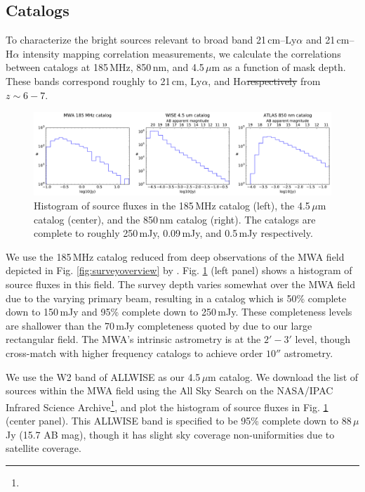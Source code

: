 \documentclass[numberedappendix]{emulateapj}
\providecommand{\DIFadd}[1]{{\protect\color{blue}\uwave{#1}}} %
\providecommand{\DIFdel}[1]{{\protect\color{red}\sout{#1}}}                      %
\providecommand{\DIFaddbegin}{} %
\providecommand{\DIFaddend}{} %
\providecommand{\DIFdelbegin}{} %
\providecommand{\DIFdelend}{} %
\providecommand{\DIFaddbeginFL}{} %
\providecommand{\DIFaddendFL}{} %
\providecommand{\DIFdelbeginFL}{} %
\providecommand{\DIFdelendFL}{} %
\begin{document}
\subsection{Catalogs}
\label{sec:catalogs}

To characterize the bright sources relevant to broad band  21\,cm--Ly$\alpha$ and  21\,cm--H$\alpha$ intensity mapping correlation measurements, we calculate the correlations between catalogs at 185\,MHz, 850\,nm, and 4.5\,$\mu$m as a function of mask depth. These bands correspond roughly to 21\,cm, Ly$\alpha$, and H$\alpha$\DIFdelbegin \DIFdel{respectively }\DIFdelend \DIFaddbegin \DIFadd{, respectively, }\DIFaddend from $z\sim6-7$. 

\begin{figure}[t]
\centering
\DIFdelbeginFL %
\DIFdelendFL \DIFaddbeginFL \includegraphics[width=6.5in]{chap5_xcor/catalog_histograms.pdf}
\DIFaddendFL \caption[Histogram of source fluxes in the 185\,MHz, 850\,nm, and 4.5\,$\mu$m catalogs.]{Histogram of source fluxes in the 185\,MHz catalog (left), the 4.5\,$\mu$m catalog (center), and the 850\,nm catalog (right). The catalogs are complete to roughly 250\,mJy, 0.09\,mJy, and 0.5\,mJy respectively.}
\label{fig:cataloghistograms}
\end{figure}

We use the 185\,MHz catalog reduced from deep observations of the MWA field depicted in Fig. \ref{fig:surveyoverview} by \citet{PattiCatalog1}. Fig. \ref{fig:cataloghistograms} (left panel) shows a histogram of source fluxes in this field. The survey depth varies somewhat over the MWA field due to the varying primary beam, resulting in a catalog which is 50\% complete down to 150\,mJy and 95\% complete down to 250\,mJy. These completeness levels are shallower than the 70\,mJy completeness quoted by \citet{PattiCatalog1} due to our large rectangular field. The MWA's intrinsic astrometry is at the $2'-3'$ level, though \citep{PattiCatalog1} cross-match with higher frequency catalogs to achieve order $10''$ astrometry. 

We use the W2 band of ALLWISE \citep{Wright2010,allwise} as our 4.5\,$\mu$m catalog. We download the list of sources within the MWA field using the All Sky Search on the NASA/IPAC Infrared Science Archive\footnote{}, and plot the histogram of source fluxes in Fig. \ref{fig:cataloghistograms} (center panel). This ALLWISE band is specified to be 95\% complete down to 88\,$\mu$Jy (15.7 AB mag), though it has slight sky coverage non-uniformities due to satellite coverage.
\end{document}
